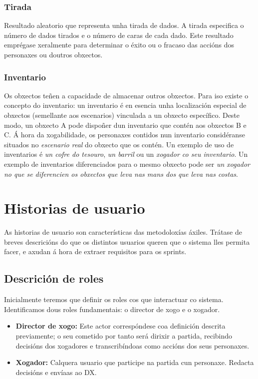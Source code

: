\subsubsection{Tirada}
Resultado aleatorio que representa unha tirada de dados. A tirada especifica o
número de dados tirados e o número de caras de cada dado. Este resultado
emprégase xeralmente para determinar o éxito ou o fracaso das accións dos
personaxes ou doutros obxectos.

\subsubsection{Inventario}
Os obxectos teñen a capacidade de almacenar outros obxectos. Para iso existe o
concepto do inventario: un inventario é en esencia unha localización especial
de obxectos (semellante aos escenarios) vinculada a un obxecto específico.
Deste modo, un obxecto A pode dispoñer dun inventario que contén aos obxectos B
e C. Á hora da xogabilidade, os personaxes contidos nun inventario
considéranse situados no {\it escenario real} do obxecto que os contén. Un
exemplo de uso de inventarios é {\it un cofre do tesouro}, {\it un barril} ou
un {\it xogador co seu inventario}. Un exemplo de inventarios diferenciados para
o mesmo obxecto pode ser {\it un xogador no que se diferencien os obxectos que
leva nas mans dos que leva nas costas}.


\section{Historias de usuario}
As historias de usuario son características das metodoloxías áxiles. Trátase de
breves descricións do que os distintos usuarios queren que o sistema lles
permita facer, e axudan á hora de extraer requisitos para os sprints.

\subsection{Descrición de roles}
Inicialmente teremos que definir os roles cos que interactuar co sistema.
Identificamos dous roles fundamentais: o director de xogo e o xogador.
\begin{itemize}
\item {\bf Director de xogo:} Este actor correspóndese coa definición descrita
previamente; o seu cometido por tanto será dirixir a partida, recibindo
decisións dos xogadores e transcribíndoas como accións dos seus personaxes.
\item {\bf Xogador:} Calquera usuario que participe na partida cun personaxe.
Redacta decisións e envíaas ao DX.
\end{itemize}

